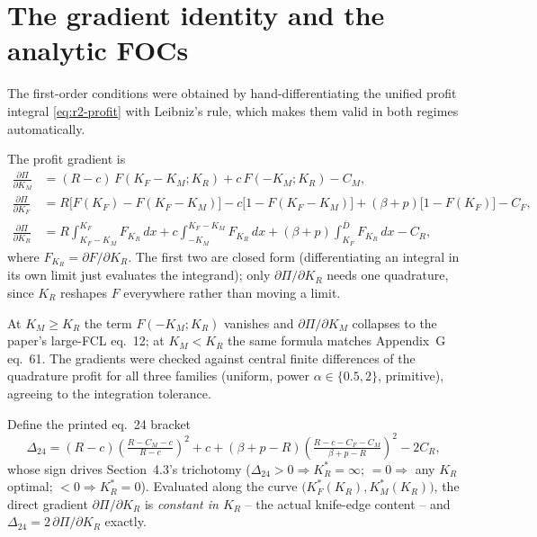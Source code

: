 \section{The gradient identity and the analytic FOCs}
\label{sec:r2-week1-gradient}

The first-order conditions were obtained by hand-differentiating the unified
profit integral \eqref{eq:r2-profit} with Leibniz's rule, which makes them valid
in both regimes automatically.

\begin{lemma}
\label{lem:r2-focs}
The profit gradient is
\begin{align}
\frac{\partial\Pi}{\partial K_M}
 &= (R-c)\,F(K_F-K_M;K_R) + c\,F(-K_M;K_R) - C_M,\\[2pt]
\frac{\partial\Pi}{\partial K_F}
 &= R\bigl[F(K_F)-F(K_F-K_M)\bigr] - c\bigl[1-F(K_F-K_M)\bigr]
    + (\beta+p)\bigl[1-F(K_F)\bigr] - C_F,\\[2pt]
\frac{\partial\Pi}{\partial K_R}
 &= R\!\int_{K_F-K_M}^{K_F}\!\!F_{K_R}\,dx + c\!\int_{-K_M}^{K_F-K_M}\!\!F_{K_R}\,dx
    + (\beta+p)\!\int_{K_F}^{\bar D}\!\!F_{K_R}\,dx - C_R,
\end{align}
where $F_{K_R}=\partial F/\partial K_R$. The first two are closed form
(differentiating an integral in its own limit just evaluates the integrand); only
$\partial\Pi/\partial K_R$ needs one quadrature, since $K_R$ reshapes $F$
everywhere rather than moving a limit.
\end{lemma}

At $K_M\ge K_R$ the term $F(-K_M;K_R)$ vanishes and $\partial\Pi/\partial K_M$
collapses to the paper's large-FCL eq.~12; at $K_M<K_R$ the same formula matches
Appendix~G eq.~61. The gradients were checked against central finite differences
of the quadrature profit for all three families (uniform, power
$\alpha\in\{0.5,2\}$, primitive), agreeing to the integration tolerance.

\begin{proposition}
\label{prop:r2-eq24}
Define the printed eq.~24 bracket
\begin{equation}
\Delta_{24}=(R-c)\!\left(\tfrac{R-C_M-c}{R-c}\right)^{2}+c
 +(\beta+p-R)\!\left(\tfrac{R-c-C_F-C_M}{\beta+p-R}\right)^{2}-2C_R,
\end{equation}
whose sign drives Section~4.3's trichotomy ($\Delta_{24}>0\Rightarrow
K_R^{*}=\infty$; $=0\Rightarrow$ any $K_R$ optimal; $<0\Rightarrow K_R^{*}=0$).
Evaluated along the curve $\bigl(K_F^{*}(K_R),K_M^{*}(K_R)\bigr)$, the direct
gradient $\partial\Pi/\partial K_R$ is \emph{constant in $K_R$} -- the actual
knife-edge content -- and $\Delta_{24}=2\,\partial\Pi/\partial K_R$ exactly.
\end{proposition}

